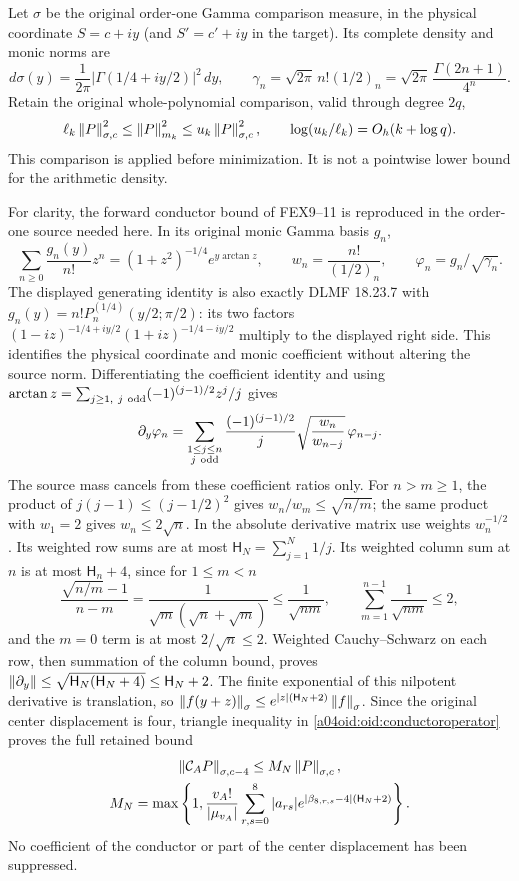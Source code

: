 Let $\sigma$ be the original order-one Gamma comparison measure,
in the physical coordinate $S=c+iy$ (and $S'=c'+iy$ in the target).
Its complete density and monic norms are
\[
 d\sigma(y)=\frac1{2\pi}|\Gamma(1/4+iy/2)|^2\,dy,\qquad
 \gamma_n=\sqrt{2\pi}\,n!(1/2)_n
 =\sqrt{2\pi}\,\frac{\Gamma(2n+1)}{4^n}.
\]
Retain the original whole-polynomial comparison, valid through degree
$2q$,
\begin{equation}\label{a04oid:oid:comparison}
 \ell_k\left\lVert P\right\rVert_{\sigma,c}^2\le\left\lVert P\right\rVert_{m_k}^2
 \le u_k\left\lVert P\right\rVert_{\sigma,c}^2,
 \qquad \log(u_k/\ell_k)=O_h(k+\log q).
\end{equation}
This comparison is applied before minimization. It is not a
pointwise lower bound for the arithmetic density.

For clarity, the forward conductor bound of FEX9--11 is reproduced
in the order-one source needed here. In its original monic Gamma
basis $g_n$,
\[
 \sum_{n\ge0}\frac{g_n(y)}{n!}z^n
 =(1+z^2)^{-1/4}e^{y\arctan z},\qquad
 w_n=\frac{n!}{(1/2)_n},\qquad \varphi_n=g_n/\sqrt{\gamma_n}.
\]
The displayed generating identity is also exactly DLMF 18.23.7
\cite{a04oid:DLMF18} with
$g_n(y)=n!P_n^{(1/4)}(y/2;\pi/2)$: its two factors
$(1-iz)^{-1/4+iy/2}(1+iz)^{-1/4-iy/2}$ multiply to the displayed
right side. This identifies the physical coordinate and monic
coefficient without altering the source norm.
Differentiating the coefficient identity and using
$\arctan z=\sum_{j\ge1,\ j\ {\rm odd}}(-1)^{(j-1)/2}z^j/j$
gives
\[
 \partial_y\varphi_n=
 \sum_{\substack{1\le j\le n\\j\ {\rm odd}}}
 \frac{(-1)^{(j-1)/2}}{j}\sqrt{\frac{w_n}{w_{n-j}}}\,
 \varphi_{n-j}.
\]
The source mass cancels from these coefficient ratios only.
For $n>m\ge1$, the product of
$j(j-1)\le(j-1/2)^2$ gives $w_n/w_m\le\sqrt{n/m}$;
the same product with $w_1=2$ gives $w_n\le2\sqrt n$.
In the absolute derivative matrix use weights $w_n^{-1/2}$.
Its weighted row sums are at most
$\mathsf H_N=\sum_{j=1}^N1/j$. Its weighted column sum at $n$ is
at most $\mathsf H_n+4$, since for $1\le m<n$
\[
 \frac{\sqrt{n/m}-1}{n-m}
 =\frac1{\sqrt m(\sqrt n+\sqrt m)}\le\frac1{\sqrt{nm}},
 \qquad \sum_{m=1}^{n-1}\frac1{\sqrt{nm}}\le2,
\]
and the $m=0$ term is at most $2/\sqrt n\le2$.
Weighted Cauchy--Schwarz on each row, then summation of the column
bound, proves
$\left\lVert\partial_y\right\rVert\le\sqrt{\mathsf H_N(\mathsf H_N+4)}
\le\mathsf H_N+2$. The finite exponential of this nilpotent
derivative is translation, so
$\left\lVert f(y+z)\right\rVert_\sigma\le e^{|z|(\mathsf H_N+2)}\left\lVert f\right\rVert_\sigma$.
Since the original center displacement is four, triangle inequality
in \eqref{a04oid:oid:conductoroperator} proves the full retained bound
\begin{equation}\label{a04oid:oid:forward}
 \begin{gathered}
 \left\lVert\mathcal C_AP\right\rVert_{\sigma,c-4}\le M_N\left\lVert P\right\rVert_{\sigma,c},\\
 M_N=\max\left\{1,\frac{v_A!}{|\mu_{v_A}|}
 \sum_{r,s=0}^8|a_{rs}|
 e^{|\beta_{8,r,s}-4|(\mathsf H_N+2)}\right\}.
 \end{gathered}
\end{equation}
No coefficient of the conductor or part of the center displacement
has been suppressed.

